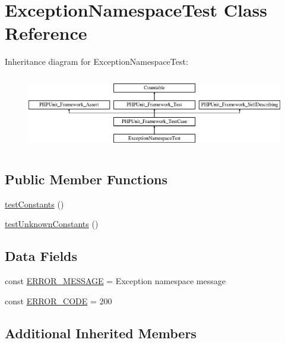 \hypertarget{class_my_1_1_space_1_1_exception_namespace_test}{}\section{Exception\+Namespace\+Test Class Reference}
\label{class_my_1_1_space_1_1_exception_namespace_test}
Inheritance diagram for Exception\+Namespace\+Test\+:\begin{figure}[H]
\begin{center}
\leavevmode
\includegraphics[height=3.303835cm]{class_my_1_1_space_1_1_exception_namespace_test}
\end{center}
\end{figure}
\subsection*{Public Member Functions}
\begin{DoxyCompactItemize}
\item 
\mbox{\hyperlink{class_my_1_1_space_1_1_exception_namespace_test_a6569023f4fa1812a53de8a36759faf57}{test\+Constants}} ()
\item 
\mbox{\hyperlink{class_my_1_1_space_1_1_exception_namespace_test_a0d383ebd7331a18abac5d39ae6bb4159}{test\+Unknown\+Constants}} ()
\end{DoxyCompactItemize}
\subsection*{Data Fields}
\begin{DoxyCompactItemize}
\item 
const \mbox{\hyperlink{class_my_1_1_space_1_1_exception_namespace_test_a7ee5ba193850ba436589d042e5b1d782}{E\+R\+R\+O\+R\+\_\+\+M\+E\+S\+S\+A\+GE}} = \textquotesingle{}Exception namespace message\textquotesingle{}
\item 
const \mbox{\hyperlink{class_my_1_1_space_1_1_exception_namespace_test_a2e110b3c20c6a3b00cdda9e6dbc2d830}{E\+R\+R\+O\+R\+\_\+\+C\+O\+DE}} = 200
\end{DoxyCompactItemize}
\subsection*{Additional Inherited Members}


